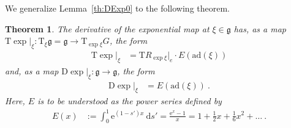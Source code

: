 \documentclass[10pt,a4paper]{article}
\theoremstyle{mytheorem}
\newtheorem{theorem}{Theorem}[section]
\theoremstyle{mydefinition}
\newcommand{\dt}{\mathrm{d}}
\newcommand{\Dt}{\mathrm{D}}
\newcommand{\Tt}{\mathrm{T}}
\newcommand{\ad}{\mathrm{ad}}
\newcommand{\fg}{\mathfrak{g}}
\begin{document}
We generalize Lemma~\ref{th:DExp0} to the following theorem.
\begin{theorem}
\label{th:DExp}
The derivative of the exponential map at $\xi\in\fg$ has, as a map $\Tt\exp|_{\xi}:\Tt_\xi\fg=\fg\rightarrow\Tt_{\exp\xi}G$, the form
\begin{align*}
	\Tt\exp|_{\xi}
	&= \Tt R_{\exp\xi}|_e\cdot E(\ad(\xi))
\end{align*}
and, as a map $\Dt\exp|_{\xi}:\fg\rightarrow\fg$, the form
\begin{align*}
	\Dt\exp|_{\xi}
	&= E(\ad(\xi))
	\ .
\end{align*}
Here, $E$ is to be understood as the power series defined by
\begin{align*}
	E(x) &:=
	\int_0^1
	\mathrm{e}^{(1-s')x}\ \dt s'
	= \frac{\mathrm{e}^x-1}{x}
	= 1 + \frac{1}{2}x + \frac{1}{6}x^2 + \ldots
	\ .
\end{align*}
\end{theorem}
\end{document}
